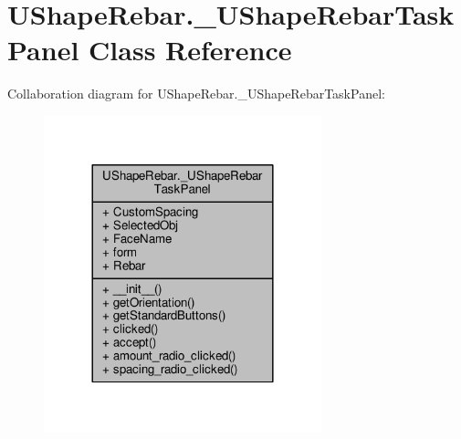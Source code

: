 \hypertarget{classUShapeRebar_1_1__UShapeRebarTaskPanel}{}\section{U\+Shape\+Rebar.\+\_\+\+U\+Shape\+Rebar\+Task\+Panel Class Reference}
\label{classUShapeRebar_1_1__UShapeRebarTaskPanel}


Collaboration diagram for U\+Shape\+Rebar.\+\_\+\+U\+Shape\+Rebar\+Task\+Panel\+:\nopagebreak
\begin{figure}[H]
\begin{center}
\leavevmode
\includegraphics[width=228pt]{classUShapeRebar_1_1__UShapeRebarTaskPanel__coll__graph}
\end{center}
\end{figure}
